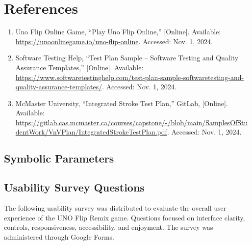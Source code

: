 \documentclass[12pt]{article}
\begin{document}
\section{References}
\begin{enumerate}
    \item Uno Flip Online Game, ``Play Uno Flip Online,'' [Online]. Available: 
    \url{https://unoonlinegame.io/uno-flip-online}. Accessed: Nov. 1, 2024.

    \item Software Testing Help, ``Test Plan Sample – Software Testing and Quality Assurance Templates,'' [Online]. Available: 
    \url{https://www.softwaretestinghelp.com/test-plan-sample-softwaretesting-and-quality-assurance-templates/}. Accessed: Nov. 1, 2024.

    \item McMaster University, ``Integrated Stroke Test Plan,'' GitLab, [Online]. Available: 
    \url{https://gitlab.cas.mcmaster.ca/courses/capstone/-/blob/main/SamplesOfStudentWork/VnVPlan/IntegratedStrokeTestPlan.pdf}. Accessed: Nov. 1, 2024.
\end{enumerate}


\subsection{Symbolic Parameters}

\subsection{Usability Survey Questions}

The following usability survey was distributed to evaluate the overall user experience of the UNO Flip Remix game. Questions focused on interface clarity, controls, responsiveness, accessibility, and enjoyment. The survey was administered through Google Forms.
\end{document}
